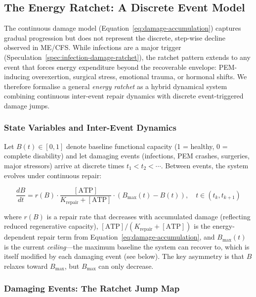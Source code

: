 \subsection{The Energy Ratchet: A Discrete Event Model}
\label{sec:ratchet-model}

The continuous damage model (Equation~\ref{eq:damage-accumulation}) captures gradual progression but does not represent the discrete, step-wise decline observed in ME/CFS. While infections are a major trigger (Speculation~\ref{spec:infection-damage-ratchet}), the ratchet pattern extends to any event that forces energy expenditure beyond the recoverable envelope: PEM-inducing overexertion, surgical stress, emotional trauma, or hormonal shifts. We therefore formalise a general \emph{energy ratchet} as a hybrid dynamical system combining continuous inter-event repair dynamics with discrete event-triggered damage jumps.



\subsubsection{State Variables and Inter-Event Dynamics}

Let $B(t) \in [0,1]$ denote baseline functional capacity (1 = healthy, 0 = complete disability) and let damaging events (infections, PEM crashes, surgeries, major stressors) arrive at discrete times $t_1 < t_2 < \cdots$. Between events, the system evolves under continuous repair:

\begin{equation}
\label{eq:ratchet-interevent}
\frac{dB}{dt} = r(B) \cdot \frac{[\text{ATP}]}{K_{\text{repair}} + [\text{ATP}]} \cdot (B_{\max}(t) - B(t)), \quad t \in (t_k, t_{k+1})
\end{equation}

where $r(B)$ is a repair rate that decreases with accumulated damage (reflecting reduced regenerative capacity), $[\text{ATP}]/(K_{\text{repair}} + [\text{ATP}])$ is the energy-dependent repair term from Equation~\ref{eq:damage-accumulation}, and $B_{\max}(t)$ is the current \emph{ceiling}---the maximum baseline the system can recover to, which is itself modified by each damaging event (see below). The key asymmetry is that $B$ relaxes toward $B_{\max}$, but $B_{\max}$ can only decrease.

\subsubsection{Damaging Events: The Ratchet Jump Map}

